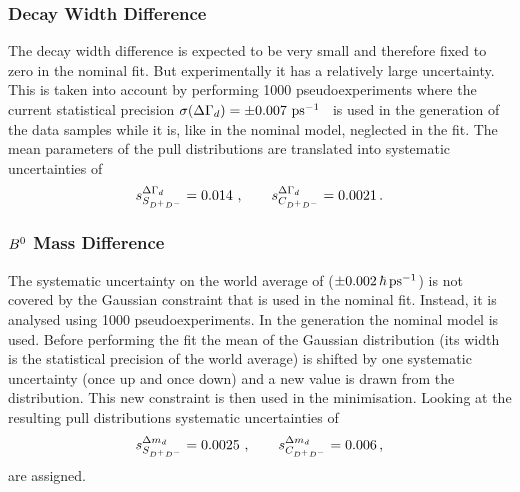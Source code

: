 \subsubsection{Decay Width Difference \texorpdfstring{\DGd}{Delta Gamma\_d}}
\label{sec:b02dd:systematics:deltagammad}

The decay width difference \DGd is expected to be very small and therefore
fixed to zero in the nominal fit. But experimentally it has a relatively large
uncertainty. This is taken into account by performing \num{1000}
pseudoexperiments where the current statistical precision $\sigma(\DGd) =
\SI{\pm0.007}{\invps}$~\cite{PDG2014} is used in the generation of the data
samples while it is, like in the nominal model, neglected in the fit. The mean
parameters of the pull distributions are translated into systematic
uncertainties of
\begin{align*}
s_{\SDD}^{\DGd} = \num{0.014}\ , \qquad s_{\CDD}^{\DGd} = \num{0.0021}\,.
\end{align*}

\subsubsection{\texorpdfstring{$\Bz$}{B0} Mass Difference \texorpdfstring{\dmd}{Delta m\_d}}
\label{sec:b02dd:systematics:deltamd}

The systematic uncertainty on the world average of \dmd
($\SI{\pm0.002}{\hbar\invps}$) is not covered by the Gaussian constraint that
is used in the nominal fit. Instead, it is analysed using \num{1000}
pseudoexperiments. In the generation the nominal model is used. Before
performing the fit the mean of the Gaussian distribution (its width is the
statistical precision of the world average) is shifted by one systematic
uncertainty (once up and once down) and a new value is drawn from the
distribution. This new constraint is then used in the minimisation. Looking at
the resulting pull distributions systematic uncertainties of
\begin{align*}
s_{\SDD}^{\dmd} = \num{0.0025}\ , \qquad s_{\CDD}^{\dmd} = \num{0.006}\,,
\end{align*}
are assigned.
